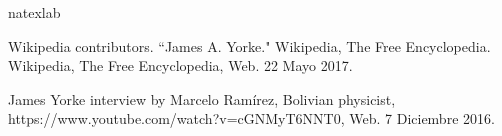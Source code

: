 \documentclass{rbf}
\begin{document}
\begin{thebibliography}{32}
\expandafter\ifx\csname natexlab\endcsname\relax\def\natexlab#1{#1}\fi


Wikipedia contributors. ``James A. Yorke." Wikipedia, The Free Encyclopedia. Wikipedia, The Free Encyclopedia, Web. 22 Mayo 2017.



James Yorke interview by Marcelo Ramírez, Bolivian physicist, https://www.youtube.com/watch?v=cGNMyT6NNT0, Web. 7 Diciembre 2016.
\end{thebibliography}
\end{document}
